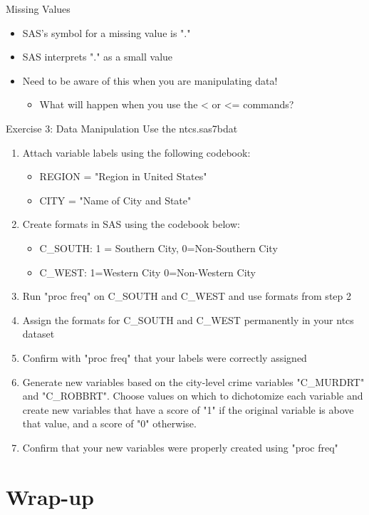 \documentclass[table,smaller]{beamer}
\begin{document}
\begin{frame}[label=sec-5-4]{Missing Values}
\begin{itemize}
\item SAS's symbol for a missing value is "."
\item SAS interprets "." as a small value
\item Need to be aware of this when you are manipulating data!
\begin{itemize}
\item What will happen when you use the < or <= commands?
\end{itemize}
\end{itemize}
\end{frame}
\begin{frame}[label=sec-5-5]{Exercise 3: Data Manipulation}
Use the ntcs.sas7bdat

\begin{enumerate}
\item Attach variable labels using the following codebook:
\begin{itemize}
\item REGION =  "Region in United States"
\item CITY = "Name of City and State"
\end{itemize}
\item Create formats in SAS using the codebook below:
\begin{itemize}
\item C\_SOUTH: 1 = Southern City, 0=Non-Southern City
\item C\_WEST: 1=Western City 0=Non-Western City
\end{itemize}
\item Run "proc freq" on C\_SOUTH and C\_WEST and use formats from step 2
\item Assign the formats for C\_SOUTH and C\_WEST permanently in your ntcs dataset
\item Confirm with "proc freq" that your labels were correctly assigned
\item Generate new variables based on the city-level crime variables "C\_MURDRT" and "C\_ROBBRT". Choose values on which to dichotomize each variable and create new variables that have a score of "1" if the original variable is above that value, and a score of "0" otherwise.
\item Confirm that your new variables were properly created using "proc freq"
\end{enumerate}
\end{frame}
\section{Wrap-up}
\label{sec-6}
\end{document}

